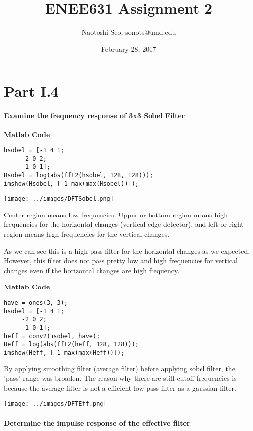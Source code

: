 \documentclass[article,oneside]{memoir}
\title {ENEE631 Assignment 2}
\author{Naotoshi Seo, sonots@umd.edu}
\date{February 28, 2007}
\begin{document}
\maketitle

\chapter{Part I.4}

\subsubsection{Examine the frequency response of 3x3 Sobel Filter}

\noindent \bf{Matlab Code}
\begin{verbatim}
hsobel = [-1 0 1;
     -2 0 2;
     -1 0 1];
Hsobel = log(abs(fft2(hsobel, 128, 128)));
imshow(Hsobel, [-1 max(max(Hsobel))]);
\end{verbatim}


\begin{center}
\texttt{[image: ../images/DFTSobel.png]}
\end{center}

Center region means low frequencies. Upper or bottom region means high frequencies for the horizontal changes (vertical edge detector), and left or right region means high frequencies for the vertical changes. 

As we can see this is a high pass filter for the horizontal changes as we expected. However, this filter does not pass pretty low and high frequencies for vertical changes even if the horizontal changes are high frequency. 

\noindent \bf{Matlab Code}
\begin{verbatim}
have = ones(3, 3);
hsobel = [-1 0 1;
     -2 0 2;
     -1 0 1];
heff = conv2(hsobel, have);
Heff = log(abs(fft2(heff, 128, 128)));
imshow(Heff, [-1 max(max(Heff))]);
\end{verbatim}

By applying smoothing filter (average filter) before applying sobel filter, the 'pass' range was broaden. 
The reason why there are still cutoff frequencies is because the average filter is not a efficient low pass filter as a gaussian filter. 

\begin{center}
\texttt{[image: ../images/DFTEff.png]}
\end{center}

\subsubsection{Determine the impulse response of the effective filter}
\end{document}

